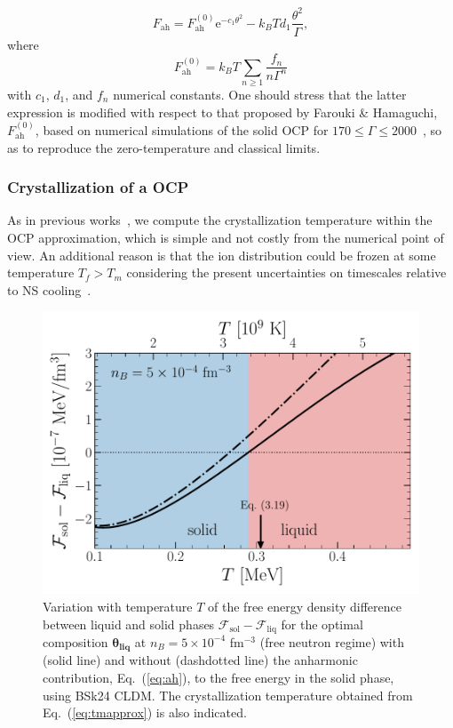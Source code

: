 \begin{equation}
  F_{\text{ah}} =
  F_{\text{ah}}^{(0)}\text{e}^{-c_1\theta^2} 
  - k_B T d_1\frac{\theta^2}{\Gamma},\label{eq:ah}
\end{equation}
%
where
%
\begin{equation}
  F_{\text{ah}}^{(0)} = k_B T\sum_{n \geq 1}\frac{f_n}{n\Gamma^n}
\end{equation}
%
with $c_1$, $d_1$, and $f_n$ numerical constants. One should stress that
the latter expression is modified with respect to that proposed by Farouki \&
Hamaguchi, $F_{\text{ah}}^{(0)}$, based on numerical simulations of 
the solid OCP for $170 \leq \Gamma \leq 2000$~\cite{Farouki1993}, so as to
reproduce the zero-temperature and classical limits.

\subsubsection{Crystallization of a OCP}

As in previous works~\cite{Fantina2020,Carreau2019,Carreau2020}, we compute 
the crystallization temperature within the OCP approximation, which is 
simple and not costly from the numerical point of view. An additional reason is
that the ion distribution could be frozen at some temperature $T_f > T_m$ 
considering the present uncertainties on timescales relative to NS 
cooling~\cite{Goriely2011}.

\begin{figure}[!t]
  \begin{center}
    \includegraphics[width=0.9\linewidth]{figures/fliqsol.pdf}
  \end{center}
  \caption[Free energy density difference between liquid and solid phases
  versus temperature]{Variation with temperature $T$ of the free energy density
  difference between liquid and solid phases
$\mathcal{F}_{\text{sol}}-\mathcal{F}_{\text{liq}}$ for the optimal composition
$\bm{\theta_{\text{liq}}}$ at $n_B=5\times 10^{-4}$ fm$^{-3}$ (free neutron 
regime) with (solid line) and without (dashdotted line) the anharmonic
contribution, Eq.~(\ref{eq:ah}), to the free energy in the solid 
phase, using BSk24 CLDM. The crystallization temperature obtained from 
Eq.~(\ref{eq:tmapprox}) is also indicated.}\label{fig:fliqsol}
\end{figure}

